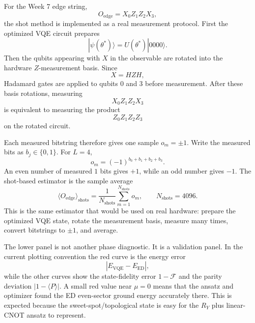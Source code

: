\documentclass[11pt]{article}
\newcommand{\ket}[1]{|#1\rangle}
\begin{document}
For the Week 7 edge string,
\begin{equation}
  O_{\mathrm{edge}}=X_0Z_1Z_2X_3,
\end{equation}
the shot method is implemented as a real measurement protocol. First the optimized VQE circuit prepares
\begin{equation}
  \ket{\psi(\theta^*)}=U(\theta^*)\ket{0000}.
\end{equation}
Then the qubits appearing with $X$ in the observable are rotated into the hardware $Z$-measurement basis. Since
\begin{equation}
  X = HZH,
\end{equation}
Hadamard gates are applied to qubits $0$ and $3$ before measurement. After these basis rotations, measuring
\begin{equation}
  X_0Z_1Z_2X_3
\end{equation}
is equivalent to measuring the product
\begin{equation}
  Z_0Z_1Z_2Z_3
\end{equation}
on the rotated circuit.

Each measured bitstring therefore gives one sample $o_m=\pm 1$. Write the measured bits as $b_j\in\{0,1\}$. For $L=4$,
\begin{equation}
  o_m=(-1)^{b_0+b_1+b_2+b_3}.
\end{equation}
An even number of measured $1$ bits gives $+1$, while an odd number gives $-1$. The shot-based estimator is the sample average
\begin{equation}
  \langle O_{\mathrm{edge}}\rangle_{\mathrm{shots}}
  =\frac{1}{N_{\mathrm{shots}}}\sum_{m=1}^{N_{\mathrm{shots}}}o_m,
  \qquad N_{\mathrm{shots}}=4096.
\end{equation}
This is the same estimator that would be used on real hardware: prepare the optimized VQE state, rotate the measurement basis, measure many times, convert bitstrings to $\pm 1$, and average.

The lower panel is not another phase diagnostic. It is a validation panel. In the current plotting convention the red curve is the energy error
\begin{equation}
  |E_{\mathrm{VQE}}-E_{\mathrm{ED}}|,
\end{equation}
while the other curves show the state-fidelity error $1-\mathcal{F}$ and the parity deviation $|1-\langle P\rangle|$. A small red value near $\mu=0$ means that the ansatz and optimizer found the ED even-sector ground energy accurately there. This is expected because the sweet-spot/topological state is easy for the $R_Y$ plus linear-CNOT ansatz to represent.
\end{document}

